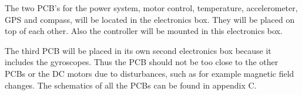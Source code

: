 The two PCB's for the power system, motor control, temperature, accelerometer, GPS and compass, will be located in the electronics box. They will be placed on top of each other. Also the controller will be mounted in this electronics box. %



The third PCB will be placed in its own second electronics box because it includes the gyroscopes. Thus the PCB should not be too close to the other PCBs or the DC motors due to disturbances, such as for example magnetic field changes. The schematics of all the PCBs can be found in appendix C.
\raggedbottom
